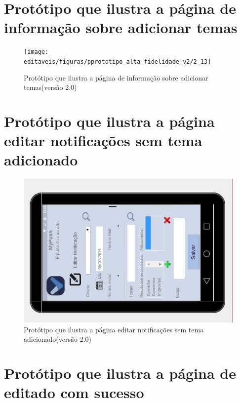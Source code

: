 \begin{apendicesenv}
      \section*{Protótipo que ilustra a página de informação sobre adicionar temas}

    \begin{figure}[!htbp]
      \centering
      \texttt{[image: editaveis/figuras/pprototipo\_alta\_fidelidade\_v2/2\_13]}
      \caption{Protótipo que ilustra a página de informação sobre adicionar temas(versão 2.0)}
      \label{v2}
    \end{figure}
    
      \section*{Protótipo que ilustra a página editar notificações sem tema adicionado}

    \begin{figure}[!htbp]
      \centering
      \includegraphics[scale=0.5, angle=-90]{editaveis/figuras/prototipo_alta_fidelidade_v2/2_14}
      \caption{Protótipo que ilustra a página editar notificações sem tema adicionado(versão 2.0)}
      \label{v2}
    \end{figure}
    
      \section*{Protótipo que ilustra a página de editado com sucesso}


\end{apendicesenv}

